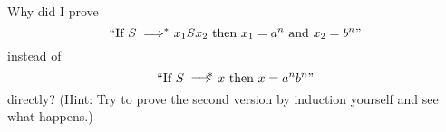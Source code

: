 Why did I prove 
\[
\text{
\lq\lq If $S \implies^{\hspace{-0,2cm} *}\ x_1S x_2$ then $x_1 = a^n$ and $x_2 = b^n$'' 
}
\]
instead of 
\[
\text{
\lq\lq If $S \implies^{\hspace{-0.3cm} *}\ x$ then $x = a^nb^n$''
}
\] 
directly? 
(Hint: Try to prove the second version by induction yourself
and see what happens.)
